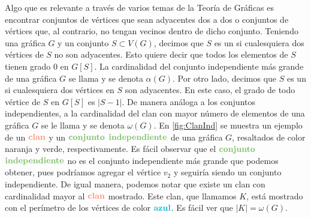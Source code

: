     Algo que es relevante a trav\'es de varios temas de la Teor\'ia de
    Gr\'aficas es encontrar conjuntos de v\'ertices que sean adyacentes dos a
    dos o conjuntos de v\'ertices que, al contrario, no tengan vecinos dentro de
    dicho conjunto. Teniendo una gr\'afica $G$ y un conjunto $S \subset V(G)$,
    decimos que $S$ es un  si cualesquiera dos
    v\'ertices de $S$ no son adyacentes. Esto quiere decir que todos los
    elementos de $S$ tienen grado $0$ en $G[S]$. La cardinalidad del conjunto
    independiente m\'as grande de una gr\'afica $G$ se llama  y se denota $\alpha (G)$. Por otro lado, decimos que $S$ es
    un  si cualesquiera dos v\'ertices en $S$ son adyacentes. En
    este caso, el grado de todo v\'ertice de $S$ en $G[S]$ es $|S-1|$. De manera
    an\'aloga a los conjuntos independientes, a la cardinalidad del clan con
    mayor n\'umero de elementos de una gr\'afica $G$ se le llama
     y se denota $\omega(G)$. En \cref{fig:ClanInd} se
    muestra un ejemplo de un ${\color{coral}\bf {clan}}$ y un ${\color{verde}\bf
    {conjunto}}$ ${\color{verde}\bf {independiente}}$ de una gr\'afica $G$,
    resaltados de color naranja y verde, respectivamente. Es f\'acil observar
    que el ${\color{verde}\bf {conjunto}}$ ${\color{verde}\bf {independiente}}$
    no es el conjunto independiente m\'as grande que podemos obtener, pues
    podr\'iamos agregar el v\'ertice $v_2$ y seguir\'ia siendo un conjunto
    independiente. De igual manera, podemos notar que existe un clan con
    cardinalidad mayor al ${\color{coral}\bf {clan}}$ mostrado. Este clan, que
    llamamos $K$, est\'a mostrado con el per\'imetro de los v\'ertices de color
    ${\color{azulCielo}\bf {azul}}$. Es f\'acil ver que $|K| = \omega (G)$.


